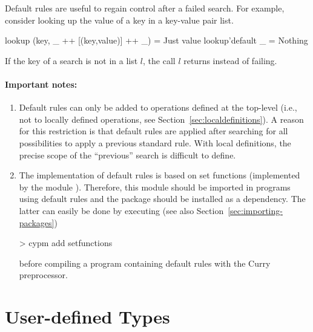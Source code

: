 Default rules are useful to regain control after a failed search.  For
example, consider looking up the value of a key in a key-value pair list.
%
\begin{curry}
  lookup (key, _ ++ [(key,value)] ++ _) = Just value
  lookup'default _ = Nothing
\end{curry}
%
If the key of a search is not in a list $l$, the call
 $l$ returns  instead of failing.

\paragraph{Important notes:}
\begin{enumerate}
\item
Default rules can only be added to operations defined at the top-level
(i.e., not to locally defined operations,
see Section~\ref{sec:localdefinitions}).
A reason for this restriction is that default rules are applied
after searching for all possibilities to apply a previous standard rule.
With local definitions, the precise scope of the ``previous'' search
is difficult to define.

\item
The implementation of default rules is based on set functions
(implemented by the module ).
Therefore, this module should be imported in programs using
default rules and the package  should be installed
as a dependency.
The latter can easily be done by executing
(see also Section~\ref{sec:importing-packages})
%
\begin{curry}
> cypm add setfunctions
\end{curry}
%
before compiling a program containing default rules with the
Curry preprocessor.
\end{enumerate}


\section{User-defined Types}

